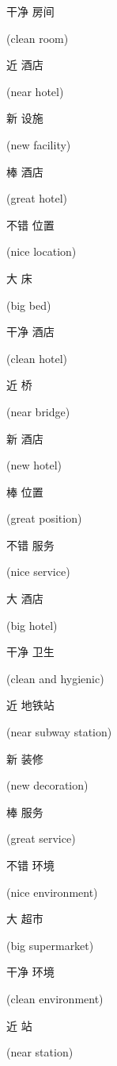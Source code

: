 \begin{CJK}{UTF8}{gbsn}干净 房间\end{CJK} (clean room)
\begin{CJK}{UTF8}{gbsn}近 酒店\end{CJK} (near hotel)
\begin{CJK}{UTF8}{gbsn}新 设施\end{CJK} (new facility)
\begin{CJK}{UTF8}{gbsn}棒 酒店\end{CJK} (great hotel)
\begin{CJK}{UTF8}{gbsn}不错 位置\end{CJK} (nice location)
\begin{CJK}{UTF8}{gbsn}大 床\end{CJK} (big bed)
\begin{CJK}{UTF8}{gbsn}干净 酒店\end{CJK} (clean hotel)
\begin{CJK}{UTF8}{gbsn}近 桥\end{CJK} (near bridge)
\begin{CJK}{UTF8}{gbsn}新 酒店\end{CJK} (new hotel)
\begin{CJK}{UTF8}{gbsn}棒 位置\end{CJK} (great position)
\begin{CJK}{UTF8}{gbsn}不错 服务\end{CJK} (nice service)
\begin{CJK}{UTF8}{gbsn}大 酒店\end{CJK} (big hotel)
\begin{CJK}{UTF8}{gbsn}干净 卫生\end{CJK} (clean and hygienic)
\begin{CJK}{UTF8}{gbsn}近 地铁站\end{CJK} (near subway station)
\begin{CJK}{UTF8}{gbsn}新 装修\end{CJK} (new decoration)
\begin{CJK}{UTF8}{gbsn}棒 服务\end{CJK} (great service)
\begin{CJK}{UTF8}{gbsn}不错 环境\end{CJK} (nice environment)
\begin{CJK}{UTF8}{gbsn}大 超市\end{CJK} (big supermarket)
\begin{CJK}{UTF8}{gbsn}干净 环境\end{CJK} (clean environment)
\begin{CJK}{UTF8}{gbsn}近 站\end{CJK} (near station)
